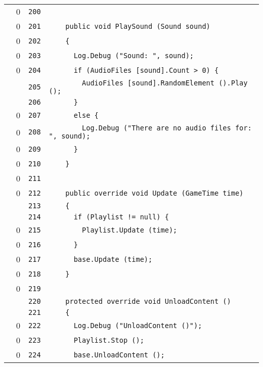 \documentclass[a4paper,10pt]{article}
\begin{document}
\begin{longtable}[l]{lrrl}
\cellcolor{red} & 0 & \verb~200~ & \verb~~\\
\cellcolor{red} & 0 & \verb~201~ & \verb~    public void PlaySound (Sound sound)~\\
\cellcolor{red} & 0 & \verb~202~ & \verb~    {~\\
\cellcolor{red} & 0 & \verb~203~ & \verb~      Log.Debug ("Sound: ", sound);~\\
\cellcolor{red} & 0 & \verb~204~ & \verb~      if (AudioFiles [sound].Count > 0) {~\\
\cellcolor{gray} &  & \verb~205~ & \verb~        AudioFiles [sound].RandomElement ().Play ();~\\
\cellcolor{gray} &  & \verb~206~ & \verb~      }~\\
\cellcolor{red} & 0 & \verb~207~ & \verb~      else {~\\
\cellcolor{red} & 0 & \verb~208~ & \verb~        Log.Debug ("There are no audio files for: ", sound);~\\
\cellcolor{red} & 0 & \verb~209~ & \verb~      }~\\
\cellcolor{red} & 0 & \verb~210~ & \verb~    }~\\
\cellcolor{red} & 0 & \verb~211~ & \verb~~\\
\cellcolor{red} & 0 & \verb~212~ & \verb~    public override void Update (GameTime time)~\\
\cellcolor{gray} &  & \verb~213~ & \verb~    {~\\
\cellcolor{gray} &  & \verb~214~ & \verb~      if (Playlist != null) {~\\
\cellcolor{red} & 0 & \verb~215~ & \verb~        Playlist.Update (time);~\\
\cellcolor{red} & 0 & \verb~216~ & \verb~      }~\\
\cellcolor{red} & 0 & \verb~217~ & \verb~      base.Update (time);~\\
\cellcolor{red} & 0 & \verb~218~ & \verb~    }~\\
\cellcolor{red} & 0 & \verb~219~ & \verb~~\\
\cellcolor{gray} &  & \verb~220~ & \verb~    protected override void UnloadContent ()~\\
\cellcolor{gray} &  & \verb~221~ & \verb~    {~\\
\cellcolor{red} & 0 & \verb~222~ & \verb~      Log.Debug ("UnloadContent ()");~\\
\cellcolor{red} & 0 & \verb~223~ & \verb~      Playlist.Stop ();~\\
\cellcolor{red} & 0 & \verb~224~ & \verb~      base.UnloadContent ();~\\

\end{longtable}
\end{document}
